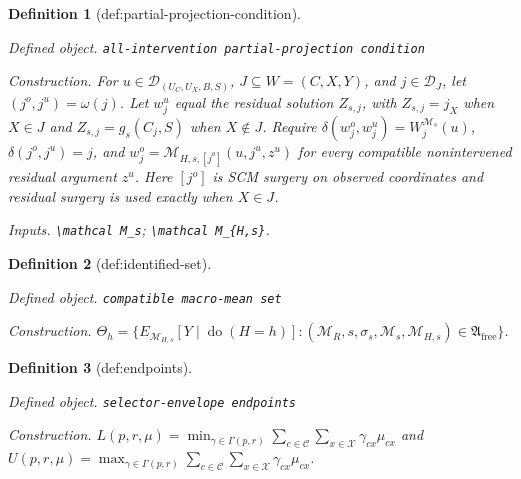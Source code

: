 \documentclass{article}
\newtheorem{definition}{Definition}
\begin{document}
\begin{definition}[def:partial-projection-condition]\label{def:partial-projection-condition}
\par\smallskip\noindent\emph{Defined object.} \texttt{all-\allowbreak{}intervention partial-\allowbreak{}projection condition}
\par\smallskip\noindent\emph{Construction.} For \(u\in\mathcal D_{(U_C,U_X,B,S)}\), \(J\subseteq W=(C,X,Y)\), and \(j\in\mathcal D_J\), let \((j^o,j^u)=\omega(j)\). Let \(w_j^u\) equal the residual solution \(Z_{s,j}\), with \(Z_{s,j}=j_X\) when \(X\in J\) and \(Z_{s,j}=g_s(C_j,S)\) when \(X\notin J\). Require \(\delta(w_j^o,w_j^u)=W_j^{\mathcal M_s}(u)\), \(\delta(j^o,j^u)=j\), and \(w_j^o=\mathcal M_{H,s,[j^o]}(u,j^u,z^u)\) for every compatible nonintervened residual argument \(z^u\). Here \([j^o]\) is SCM surgery on observed coordinates and residual surgery is used exactly when \(X\in J\).
\par\smallskip\noindent\emph{Inputs.} \texttt{\textbackslash{}\allowbreak{}mathcal M\_\allowbreak{}s}; \texttt{\textbackslash{}\allowbreak{}mathcal M\_\allowbreak{}\{H,\allowbreak{}s\}\allowbreak{}}.
\end{definition}

\begin{definition}[def:identified-set]\label{def:identified-set}
\par\smallskip\noindent\emph{Defined object.} \texttt{compatible macro-\allowbreak{}mean set}
\par\smallskip\noindent\emph{Construction.} \(\Theta_h=\{E_{\mathcal M_{H,s}}[Y\mid\operatorname{do}(H=h)]:(\mathcal M_R,s,\sigma_s,\mathcal M_s,\mathcal M_{H,s})\in\mathfrak A_{\mathrm{free}}\}\).
\end{definition}

\begin{definition}[def:endpoints]\label{def:endpoints}
\par\smallskip\noindent\emph{Defined object.} \texttt{selector-\allowbreak{}envelope endpoints}
\par\smallskip\noindent\emph{Construction.} \(L(p,r,\mu)=\min_{\gamma\in\Gamma(p,r)}\sum_{c\in\mathcal C}\sum_{x\in\mathcal X}\gamma_{cx}\mu_{cx}\) and \(U(p,r,\mu)=\max_{\gamma\in\Gamma(p,r)}\sum_{c\in\mathcal C}\sum_{x\in\mathcal X}\gamma_{cx}\mu_{cx}\).
\end{definition}
\end{document}
